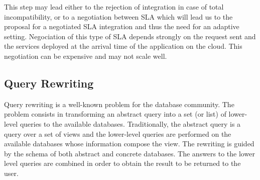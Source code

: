 This step may lead either to the rejection of integration in case of total incompatibility, or to a negotiation between SLA which will lead us to the proposal for a negotiated SLA integration and thus the need for an adaptive setting.
%
%
%
 Negociation of this type of SLA depends strongly on the request sent and the services deployed at the arrival time of the application on the cloud. This negotiation can be expensive and may not scale well.


\subsection{Query Rewriting}
\label{sec:queryRew}

Query rewriting is a well-known problem for the database community.
The problem consists in transforming an abstract query into a set (or list) of lower-level queries to the available databases.
Traditionally, the abstract query is a query over a set of views and the lower-level queries are performed on the available databases whose information compose the view. 
The rewriting is guided by the schema of both abstract and concrete databases.
The answers to the lower level queries are combined in order to obtain the result to be returned to the user.

